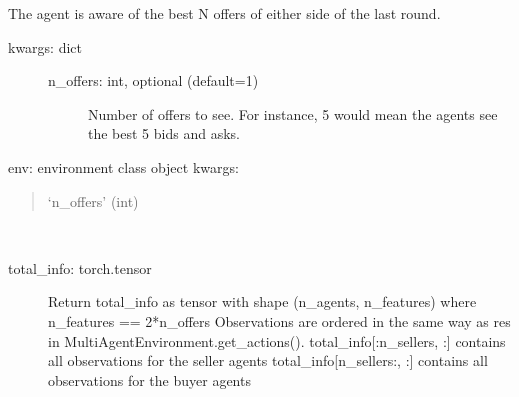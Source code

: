 \documentclass[letterpaper,10pt,english]{sphinxmanual}
\begin{document}
\begin{fulllineitems}
\label{\detokenize{MultiAgentMarketRL:info_setting.OfferInformationSetting}}
\sphinxAtStartPar
The agent is aware of the best N offers of either side of the last round.
\begin{description}
\item[{kwargs: dict}] \leavevmode\begin{description}
\item[{n\_offers: int, optional (default=1)}] \leavevmode
\sphinxAtStartPar
Number of offers to see. For instance, 5 would mean the agents see the
best 5 bids and asks.

\end{description}

\end{description}

\begin{fulllineitems}
\label{\detokenize{MultiAgentMarketRL:info_setting.OfferInformationSetting.__init__}}
\sphinxAtStartPar
env: environment class object
kwargs:
\begin{quote}

\sphinxAtStartPar
‘n\_offers’ (int)
\end{quote}

\end{fulllineitems}


\begin{fulllineitems}
\label{\detokenize{MultiAgentMarketRL:info_setting.OfferInformationSetting.get_states}}~\begin{description}
\item[{total\_info: torch.tensor}] \leavevmode
\sphinxAtStartPar
Return total\_info as tensor with shape (n\_agents, n\_features) where n\_features == 2*n\_offers
Observations are ordered in the same way as res in MultiAgentEnvironment.get\_actions().
total\_info{[}:n\_sellers, :{]} contains all observations for the seller agents
total\_info{[}n\_sellers:, :{]} contains all observations for the buyer agents

\end{description}

\end{fulllineitems}


\end{fulllineitems}
\end{document}
